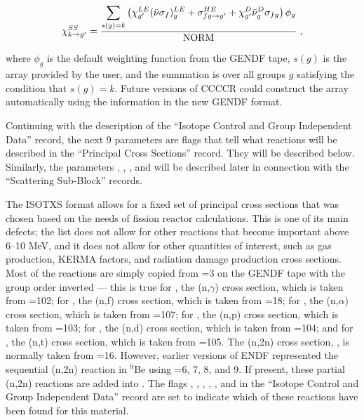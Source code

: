 \begin{equation}
   \chi^{SS}_{k\rightarrow g'}=\frac{\displaystyle\sum_{s(g)=k}\big(
       \chi^{LE}_{g'}(\bar{\nu}\sigma_f)^{LE}_g
     +\sigma^{HE}_{fg\rightarrow g'}+\chi^D_{g'}\bar{\nu}^D_g
        \sigma_{fg}\big)\,\phi_g}
      {{\rm NORM}} \,\,,
\end{equation}

\noindent
where $\phi_g$ is the default weighting function from the GENDF tape,
$s(g)$ is the  array provided by the user, and the summation
is over all groups $g$ satisfying the condition that $s(g){=}k$.  Future
versions of CCCCR could construct the  array automatically
using the information in the new GENDF format.

Continuing with the description of the ``Isotope Control and Group
Independent Data'' record, the next 9 parameters are flags that tell
what reactions will be described in the ``Principal Cross Sections''
record.  They will be described below.  Similarly, the parameters
, , , and 
will be described later in connection with the ``Scattering Sub-Block''
records.

The ISOTXS format allows for a fixed set of principal cross sections that
was chosen based on the needs of fission reactor calculations.  This
is one of its main defects; the list does not allow for other reactions
that become important above 6--10 MeV, and it does not allow for other
quantities of interest, such as gas production, KERMA factors, and
radiation damage production cross sections.  Most of the reactions are
simply copied from =3 on the GENDF tape with the group order
inverted --- this is true for , the (n,$\gamma$) cross
section, which is taken from =102; for , the (n,f) cross
section, which is taken from =18; for , the (n,$\alpha$)
cross section, which is taken from =107; for , the (n,p)
cross section, which is taken from =103; for , the (n,d)
cross section, which is taken from =104; and for , the
(n,t) cross section, which is taken from =105.  The (n,2n) cross
section, , is normally taken from =16.  However, earlier
versions of ENDF represented the sequential (n,2n) reaction in $^9$Be
using =6, 7, 8, and 9.  If present, these partial (n,2n) reactions
are added into .  The flags , ,
, , , and  in the
``Isotope Control and Group Independent Data'' record are set to
indicate which of these reactions have been found for this material.

